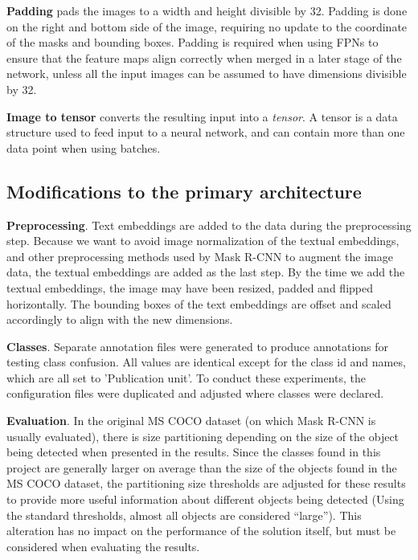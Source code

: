 \documentclass[oneside, english, bibtex]{kththesis}
\begin{document}
\textbf{Padding} pads the images to a width and height divisible by 32.
Padding is done on the right and bottom side of the image, requiring no update to the coordinate of the masks and bounding boxes.
Padding is required when using FPNs to ensure that the feature maps align correctly when merged in a later stage of the network, unless all the input images can be assumed to have dimensions divisible by 32.

\textbf{Image to tensor} converts the resulting input into a \textit{tensor}.
A tensor is a data structure used to feed input to a neural network, and can contain more than one data point when using batches.


\subsection{Modifications to the primary architecture}

\textbf{Preprocessing}. Text embeddings are added to the data during the preprocessing step.
Because we want to avoid image normalization of the textual embeddings, and other preprocessing methods used by Mask R-CNN to augment the image data,
the textual embeddings are added as the last step. By the time we add the textual embeddings, the image may have been resized, padded and flipped horizontally.
The bounding boxes of the text embeddings are offset and scaled accordingly to align with the new dimensions.

\textbf{Classes}. Separate annotation files were generated to produce annotations for testing class confusion.
All values are identical except for the class id and names, which are all set to 'Publication unit'.
To conduct these experiments, the configuration files were duplicated and adjusted where classes were declared.

\textbf{Evaluation}. In the original MS COCO dataset (on which Mask R-CNN is usually evaluated),
there is size partitioning depending on the size of the object being detected when presented in the results.
Since the classes found in this project are generally larger on average than the size of the objects found in the MS COCO dataset,
the partitioning size thresholds are adjusted for these results to provide more useful information about different objects being detected (Using the standard thresholds, almost all objects are considered “large”).
This alteration has no impact on the performance of the solution itself, but must be considered when evaluating the results.
\end{document}
